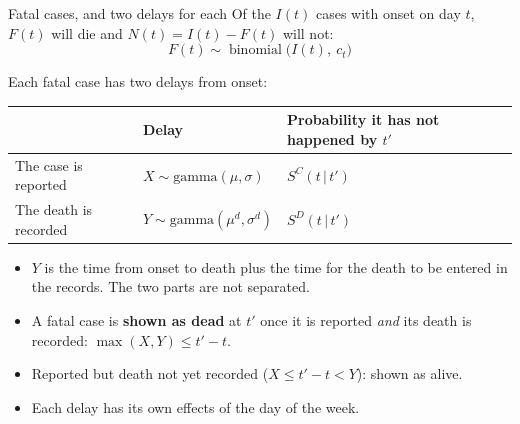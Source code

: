 \documentclass[aspectratio=169,9pt]{beamer}
\newcommand{\given}{\,|\,}
\newcommand{\bin}{\operatorname{binomial}}
\begin{document}
\begin{frame}{Fatal cases, and two delays for each}
Of the $I(t)$ cases with onset on day $t$, $F(t)$ will die and
$N(t)=I(t)-F(t)$ will not:
\[
F(t)\sim\bin\bigl(I(t),\ c_t\bigr)
\]

\medskip
Each fatal case has two delays from onset:

\smallskip
\begin{center}
\renewcommand{\arraystretch}{1.3}
\begin{tabular}{lll}
\toprule
 & Delay & Probability it has not happened by $t'$ \\
\midrule
The case is reported & $X\sim\text{gamma}(\mu,\sigma)$ & $S^{C}(t\given t')$ \\
The death is recorded & $Y\sim\text{gamma}(\mu^{d},\sigma^{d})$ & $S^{D}(t\given t')$ \\
\bottomrule
\end{tabular}
\end{center}

\medskip
\begin{itemize}
\item $Y$ is the time from onset to death plus the time for the death to be
entered in the records. The two parts are not separated.
\item A fatal case is \textbf{shown as dead} at $t'$ once it is reported
\emph{and} its death is recorded: $\max(X,Y)\le t'-t$.
\item Reported but death not yet recorded ($X\le t'-t<Y$): shown as alive.
\item Each delay has its own effects of the day of the week.
\end{itemize}
\end{frame}
\end{document}
